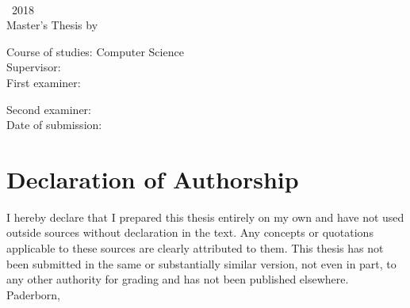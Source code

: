 \documentclass[a4paper,
	DIV=12,
	BCOR=1cm,
	twoside,
	toc=listofnumbered,
	bibliography=totocnumbered,
	numbers=noenddot,
	abstract=on
	]{scrreprt}
\newtheorem[style=M, bodystyle={\noindent}]{theorem}{Theorem}
\newtheorem[style=M, bodystyle={\noindent}]{definition}[theorem]{Definition}
\begin{document}
	\newcommand{\fancy}{
		\fancyhf{}
		\renewcommand{\headrulewidth}{0.0pt}
		\fancyfoot[C]{}
		\fancyfoot[LO,RE]{\scriptsize \Title}
		\fancyfoot[LE,RO]{\small \thepage}
		\renewcommand{\footrulewidth}{0.5pt}
	}
	\pagestyle{fancy}
	\fancy
	\fancypagestyle{plain}{\fancy}


\newpage
	\thispagestyle{empty}
	~\ \\[430pt]

	\textcopyright~2018 \Author
	\ \\

	Master's Thesis by \Author

	Course of studies: Computer Science
	\ \: \Supervisor
	\ \\

	First examiner: \Supervisor

	Second examiner: \SecondExaminer
	\ \\

	Date of submission: \DateOfThesisSubmission


	


	\tableofcontents


	\chapter*{Declaration of Authorship}
		I hereby declare that I prepared this thesis entirely on my own and have not used outside sources without declaration in the text.
		Any concepts or quotations applicable to these sources are clearly attributed to them.
		This thesis has not been submitted in the same or substantially similar version, not even in part, to any other authority for grading and has not been published elsewhere.\\[27pt]

		Paderborn, \DateOfThesisSubmission \\[20pt]

		\Author

	\newpage

	
	
	
	
	
	
	
	


	\appendix

	
	\listoffigures
	\listoftables
	\lstlistoflistings

	
	
	\label{bibliography}	
\end{document}
